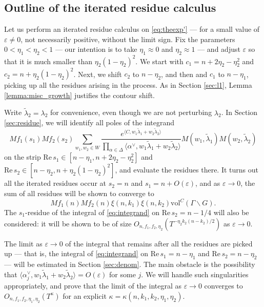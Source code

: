 \documentclass[11pt]{amsart}
\numberwithin{theorem}{section}
\numberwithin{equation}{section}
\theoremstyle{remark}
\theoremstyle{definition}
\newcommand{\re}{\mathrm{Re}\,}
\newcommand{\vol}{\mathrm{vol}}
\begin{document}
\subsection{Outline of the iterated residue calculus} \label{sec:outline}

Let us perform an iterated residue calculus on \eqref{eq:theexp'} --- for a small value of $\varepsilon \neq 0$, not necessarily positive, without the limit sign. Fix the parameters $0 < \eta_1 < \eta_2 < 1$ --- our intention is to take $\eta_1 \approx 0$ and $\eta_2 \approx 1$ --- and adjust $\varepsilon$ so that it is much smaller than $\eta_2(1-\eta_2)^2$.  We start with $c_1 = n + 2\eta_2-\eta_2^2$ and $c_2 = n + \eta_2(1-\eta_2)^2$. Next, we shift $c_2$ to $n-\eta_2$, and then and $c_1$ to $n-\eta_1$, picking up all the residues arising in the process. As in Section \ref{sec:l1}, Lemma \ref{lemma:misc_growth} justifies the contour shift.

Write $\tilde\lambda_2 = \lambda_2$ for convenience, even though we are not perturbing $\lambda_2$.
In Section \ref{sec:residue}, we will identify all poles of the integrand
\begin{equation} \label{eq:integrand}
Mf_1(s_1)Mf_2(s_2)\sum_{w_1,w_2 \in W} \frac{e^{\langle C, w_1\tilde\lambda_1+w_2\tilde\lambda_2 \rangle}}{\prod_{\alpha \in \Delta}\langle \alpha^\vee, w_1\tilde\lambda_1 + w_2\tilde\lambda_2 \rangle} M(w_1,\tilde\lambda_1)M(w_2,\tilde\lambda_2)
\end{equation}
on the strip $\re s_1 \in [n-\eta_1,n+2\eta_2-\eta_2^2]$ and $\re s_2 \in [n-\eta_2,n+\eta_2(1-\eta_2)^2]$, and evaluate the residues there. It turns out all the iterated residues occur at $s_2=n$ and $s_1=n+O(\varepsilon)$, and as $\varepsilon \rightarrow 0$, the sum of all residues will be shown to converge to
\begin{equation} \label{eq:residue}
Mf_1(n)Mf_2(n)\xi(n,k_1)\xi(n,k_2)\vol^C(\Gamma\backslash G).
\end{equation}
The $s_1$-residue of the integral of \eqref{eq:integrand} on $\re s_2=n-1/4$ will also be considered: it will be shown to be of size $O_{n,f_1,f_2,\eta_2}(T^{-\eta_2 k_2(n-k_2)/2})$ as $\varepsilon \rightarrow 0$.

The limit as $\varepsilon \rightarrow 0$ of the integral that remains after all the residues are picked up --- that is, the integral of \eqref{eq:integrand} on $\re s_1=n-\eta_1$ and $\re s_2=n-\eta_2$ --- will be estimated in Section \ref{sec:denom}.
The main obstacle is the possibility that
$ \langle \alpha^\vee_j,w_1\tilde\lambda_1+w_2\tilde\lambda_2\rangle = O(\varepsilon)$ for some $j$. We will handle such singularities appropriately, and prove that the limit of the integral as $\varepsilon \rightarrow 0$ converges to $O_{n,f_1,f_2,\eta_1,\eta_2}(T^\kappa)$ for an explicit $\kappa = \kappa(n,k_1,k_2,\eta_1,\eta_2)$.
\end{document}
